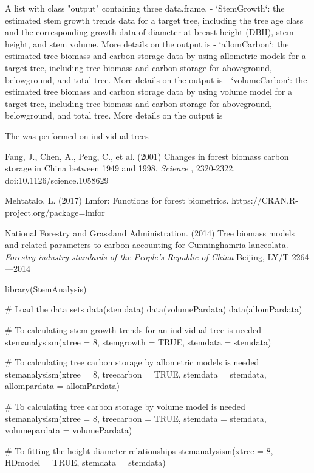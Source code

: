 \documentclass[a4paper]{book}
\begin{document}
\begin{Value}
A list with class "output" containing three data.frame.
- `StemGrowth`: the estimated stem growth trends data for a target tree, including the tree age class and the corresponding growth data of diameter at breast height (DBH), stem height, and stem volume. More details on the output is 
- `allomCarbon`: the estimated tree biomass and carbon storage data by using allometric models for a target tree, including tree biomass and carbon storage for aboveground, belowground, and total tree. More details on the output is 
- `volumeCarbon`: the estimated tree biomass and carbon storage data by using volume model for a target tree, including tree biomass and carbon storage for aboveground, belowground, and total tree. More details on the output is 
\end{Value}
%
\begin{Note}\relax
The  was performed on individual trees
\end{Note}
%
\begin{References}\relax
Fang, J., Chen, A., Peng, C., et al. (2001)
Changes in forest biomass carbon storage in China between 1949 and 1998.
\emph{Science}
, 2320-2322. doi:10.1126/science.1058629

Mehtatalo, L. (2017)
Lmfor: Functions for forest biometrics.
https://CRAN.R-project.org/package=lmfor

National Forestry and Grassland Administration. (2014) Tree biomass models and
related parameters to carbon accounting for Cunninghamria lanceolata.
\emph{Forestry industry standards of the People's Republic of China}
Beijing, LY/T 2264—2014
\end{References}
%
\begin{Examples}
\begin{ExampleCode}

library(StemAnalysis)

# Load the data sets
data(stemdata)
data(volumePardata)
data(allomPardata)

# To calculating stem growth trends for an individual tree is needed
stemanalysism(xtree = 8, stemgrowth = TRUE, stemdata = stemdata)

# To calculating tree carbon storage by allometric models is needed
stemanalysism(xtree = 8, treecarbon = TRUE, stemdata = stemdata,
             allompardata = allomPardata)

# To calculating tree carbon storage by volume model is needed
stemanalysism(xtree = 8, treecarbon = TRUE, stemdata = stemdata,
             volumepardata = volumePardata)

# To fitting the height-diameter relationships
stemanalysism(xtree = 8, HDmodel = TRUE, stemdata = stemdata)

\end{ExampleCode}
\end{Examples}
\end{document}
